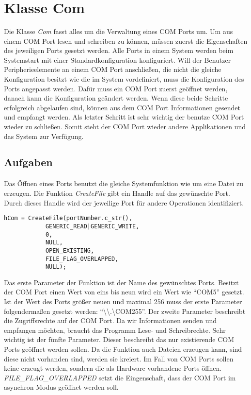 \section{Klasse Com}
\paragraph{}
Die Klasse \textit{Com} fasst alles um die Verwaltung eines COM Ports um. Um aus einem COM Port lesen und schreiben zu können, müssen zuerst die Eigenschaften des jeweiligen Ports gesetzt werden. Alle Ports in einem System werden beim Systemstart mit einer Standardkonfiguration konfiguriert. Will der Benutzer Peripherieelemente an einem COM Port anschließen, die nicht die gleiche Konfiguration besitzt wie die im System vordefiniert, muss die Konfiguration des Ports angepasst werden. Dafür muss ein COM Port zuerst geöffnet werden, danach kann die Konfiguration geändert werden. Wenn diese beide Schritte erfolgreich abgelaufen sind, können aus dem COM Port Informationen gesendet und empfangt werden. Als letzter Schritt ist sehr wichtig der benutze COM Port wieder zu schließen. Somit steht der COM Port wieder andere Applikationen und das System zur Verfügung.\\

\subsection{Aufgaben}
\paragraph{}
Das Öffnen eines Ports benutzt die gleiche Systemfunktion wie um eine Datei zu erzeugen. Die Funktion \textit{CreateFile} gibt ein Handle auf das gewünschte Port. Durch dieses Handle wird der jeweilige Port für andere Operationen identifiziert.

\begin{lstlisting}	 
hCom = CreateFile(portNumber.c_str(),  
            GENERIC_READ|GENERIC_WRITE,
            0, 
            NULL,
            OPEN_EXISTING, 
            FILE_FLAG_OVERLAPPED,
            NULL); 

\end{lstlisting}

Das erste Parameter der Funktion ist der Name des gewünschtes Ports. Besitzt der COM Port einen Wert von eins bis neun wird ein Wert wie "`COM5"' gesetzt. Ist der Wert des Ports größer neuen und maximal 256 muss der erste Parameter folgendermaßen gesetzt werden: "`\textbackslash\textbackslash.\textbackslash COM255"'. Der zweite Parameter beschreibt die Zugriffsrechte auf der COM Port. Da wir Informationen senden und empfangen möchten, braucht das Programm Lese- und Schreibrechte. Sehr wichtig ist der fünfte Parameter. Dieser beschreibt das nur existierende COM Ports geöffnet werden sollen. Da die Funktion auch Dateien erzeugen kann, sind diese nicht vorhanden sind, werden sie kreiert. Im Fall von COM Ports sollen keine erzeugt werden, sondern die als Hardware vorhandene Ports öffnen. \textit{FILE\_FLAG\_OVERLAPPED} setzt die Eingenschaft, dass der COM Port im asynchron Modus geöffnet werden soll.\\

